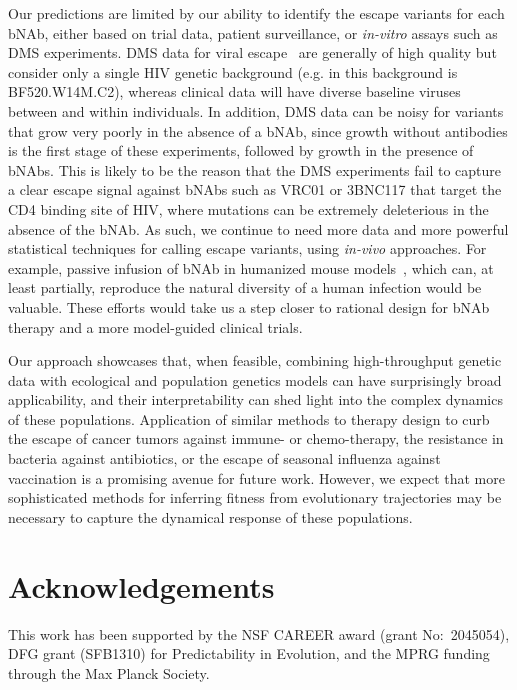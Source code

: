 \documentclass[aps,prx,noshowpacs,twocolumn,nofootinbib]{revtex4-2}
\begin{document}
Our predictions are limited by our ability to identify the escape variants for each bNAb, either based on  trial data, patient surveillance, or {\em in-vitro} assays such as DMS experiments. DMS data for viral escape~\cite{Dingens:2017bk,Dingens:2019fd,Schommers:2020er} are generally of high quality but consider only a single HIV genetic background (e.g. in \cite{Dingens:2017bk} this background is BF520.W14M.C2), whereas clinical data will have diverse baseline viruses between and within individuals. In addition, DMS data can be noisy for variants that grow very poorly in the absence of a bNAb, since  growth without antibodies is the first stage  of these experiments, followed by   growth  in the presence of  bNAbs. This is likely to be the reason that the DMS experiments  fail to capture a clear escape signal against bNAbs such as VRC01 or 3BNC117 that target the CD4 binding site of HIV, where mutations can be extremely deleterious  in the absence of the bNAb. As such, we continue to need more data and more powerful statistical techniques for calling escape variants, using {\it in-vivo} approaches. For example, passive infusion of bNAb  in humanized mouse models~\cite{Gruell:2017}, which can, at least partially, reproduce the natural diversity of a human infection would be valuable. These efforts would take us a step closer to rational design for  bNAb therapy and a more model-guided clinical trials.

Our approach showcases that, when feasible,  combining high-throughput genetic data with ecological and population genetics models can have surprisingly broad  applicability, and their interpretability can shed light  into the complex dynamics of these populations.  Application of similar methods to therapy design to curb the escape of cancer tumors against immune- or chemo-therapy, the resistance in bacteria against antibiotics, or the escape of  seasonal influenza against vaccination is a promising avenue for future work. However, we expect that more  sophisticated methods for inferring fitness from evolutionary trajectories  may be necessary to capture the dynamical response of these populations.

\section*{Acknowledgements}
This work has been supported by the NSF CAREER award (grant No:~2045054), DFG grant (SFB1310) for Predictability in Evolution, and the MPRG funding through the Max Planck Society.
\end{document}
